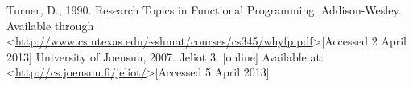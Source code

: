 \documentclass[11pt]{article} %
\begin{document}

\begin{thebibliography}{99}
	Turner, D., 1990. Research Topics in Functional Programming, Addison-Wesley. Available through \textless \url{http://www.cs.utexas.edu/~shmat/courses/cs345/whyfp.pdf}\textgreater [Accessed 2 April 2013]
	University of Joensuu, 2007. Jeliot 3. [online] Available at: \textless\url{http://cs.joensuu.fi/jeliot/}\textgreater [Accessed 5 April 2013]
\end{thebibliography}
\end{document}
